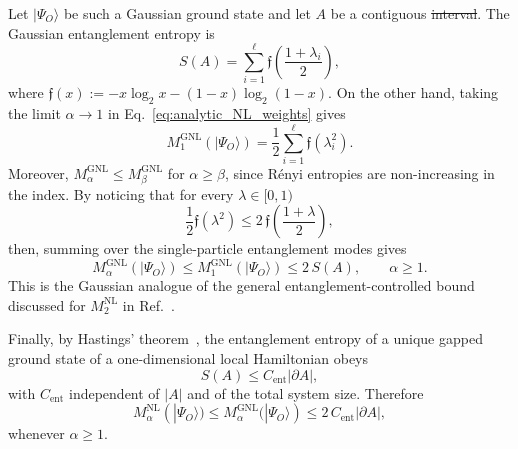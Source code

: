 \documentclass[prx,twocolumn,superscriptaddress,aps,10pt, frontmatterverbose, reprint,footinbib,longbibliography=true]{revtex4-2}
\newcommand{\RENYI}{\alpha}
\providecommand{\DIFaddtex}[1]{{\protect\color{red}\uwave{#1}}} %
\providecommand{\DIFdeltex}[1]{{\protect\color{red}\sout{#1}}}                      %
\providecommand{\DIFaddbegin}{\protect\color{red}} %
\providecommand{\DIFaddend}{\protect\color{black}} %
\providecommand{\DIFdelbegin}{} %
\providecommand{\DIFdelend}{} %
\providecommand{\DIFadd}[1]{\texorpdfstring{\DIFaddtex{#1}}{#1}} %
\providecommand{\DIFdel}[1]{\texorpdfstring{\DIFdeltex{#1}}{}} %
\newcommand{\DIFscaledelfig}{0.5}
\newlength{\DIFdelgraphicswidth} %
\newlength{\DIFdelgraphicsheight} %
\newcommand{\DIFaddincludegraphics}[2][]{{\color{blue}\fbox{\DIFOincludegraphics[#1]{#2}}}} %
\newcommand{\DIFdelincludegraphics}[2][]{%
\sbox{\DIFdelgraphicsbox}{\DIFOincludegraphics[#1]{#2}}%
\settoboxwidth{\DIFdelgraphicswidth}{\DIFdelgraphicsbox} %
\settoboxtotalheight{\DIFdelgraphicsheight}{\DIFdelgraphicsbox} %
\scalebox{\DIFscaledelfig}{%
\parbox[b]{\DIFdelgraphicswidth}{\usebox{\DIFdelgraphicsbox}\\[-\baselineskip] \rule{\DIFdelgraphicswidth}{0em}}\llap{\resizebox{\DIFdelgraphicswidth}{\DIFdelgraphicsheight}{%
\setlength{\unitlength}{\DIFdelgraphicswidth}%
\begin{picture}(1,1)%
\thicklines\linethickness{2pt} %
{\color[rgb]{1,0,0}\put(0,0){\framebox(1,1){}}}%
{\color[rgb]{1,0,0}\put(0,0){\line( 1,1){1}}}%
{\color[rgb]{1,0,0}\put(0,1){\line(1,-1){1}}}%
\end{picture}%
}\hspace*{3pt}}} %
} %
\DeclareRobustCommand{\DIFaddbegin}{\DIFOaddbegin \let\includegraphics\DIFaddincludegraphics} %
\DeclareRobustCommand{\DIFaddend}{\DIFOaddend \let\includegraphics\DIFOincludegraphics} %
\DeclareRobustCommand{\DIFdelbegin}{\DIFOdelbegin \let\includegraphics\DIFdelincludegraphics} %
\DeclareRobustCommand{\DIFdelend}{\DIFOaddend \let\includegraphics\DIFOincludegraphics} %
\begin{document}
Let $|\Psi_O\rangle$ be such a Gaussian ground state and let \DIFdelbegin \DIFdel{$A$ }\DIFdelend \DIFaddbegin \DIFadd{$A=\{1,\dots,\ell\}$ }\DIFaddend be a contiguous \DIFdelbegin \DIFdel{interval}\DIFdelend \DIFaddbegin \DIFadd{block, as in Theorem~\ref{thm:global}}\DIFaddend . The Gaussian entanglement entropy is
\begin{equation}
    S(A)=
    \sum_{i=1}^{\ell}
    \mathfrak{f}\!\left(\frac{1+\lambda_i}{2}\right),
    \label{eq:gaussian_entropy_area_law_sec}
\end{equation}
where $\mathfrak{f}(x):=-x\log_2x-(1-x)\log_2(1-x)$. On the other hand, taking the limit \(\RENYI\to1\) in Eq.~\eqref{eq:analytic_NL_weights} gives
\begin{equation}
    M_{1}^{\mathrm{GNL}}(|\Psi_O\rangle)
    =
    \frac{1}{2}
    \sum_{i=1}^{\ell}
    \mathfrak{f}(\lambda_i^2).
    \label{eq:M1_GNL}
\end{equation}
Moreover, $M_{\alpha}^{\mathrm{GNL}}\le M_{\beta}^{\mathrm{GNL}}$ for $\alpha\ge\beta$, since R\'enyi entropies are non-increasing in the index. By noticing that for every $\lambda\in[0,1)$
\begin{equation}
    \frac{1}{2}\mathfrak{f}(\lambda^2)
    \le
    2\, \mathfrak{f}\!\left(\frac{1+\lambda}{2}\right),
    \label{eq:m1_entropy_bound}
\end{equation}
then, summing over the single-particle entanglement modes gives
\begin{equation}
    M_{\RENYI}^{\mathrm{GNL}}(|\Psi_O\rangle)
    \le
    M_{1}^{\mathrm{GNL}}(|\Psi_O\rangle)
    \le
    2\, S(A),
    \qquad
    \RENYI\ge1.
    \label{eq:GNL_bound_by_entropy_all_alpha}
\end{equation}
This is the Gaussian analogue of the general entanglement-controlled bound discussed for $M_2^{\mathrm{NL}}$ in Ref.~\cite{Cao_2025}.

Finally, by Hastings' theorem~\cite{Hastings_2007}, the entanglement entropy of a unique gapped ground state of a one-dimensional local Hamiltonian obeys
\begin{equation}
    S(A)\le C_{\mathrm{ent}}|\partial A|,
    \label{eq:Hastings_area_law}
\end{equation}
with $C_{\mathrm{ent}}$ independent of $|A|$ and of the total system size. Therefore
\begin{equation}
    M_{\RENYI}^{\mathrm{NL}}(|\Psi_O\rangle)
    \le
    M_{\RENYI}^{\mathrm{GNL}}(|\Psi_O\rangle)
    \le
    2\, C_{\mathrm{ent}}|\partial A|,
    \label{eq:GNL_area_law_final}
\end{equation}
whenever $\RENYI\ge1$. 
\end{document}
